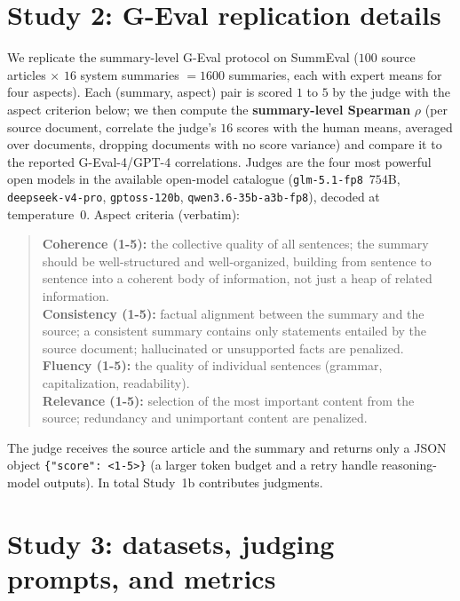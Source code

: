 \section{Study 2: G-Eval replication details}\label{app:s1bdetail}
We replicate the summary-level G-Eval protocol \citep{liu2023geval} on SummEval \citep{fabbri2021summeval}
($100$ source articles $\times$ $16$ system summaries $=1600$ summaries, each with expert means for four aspects).
Each (summary, aspect) pair is scored $1$ to $5$ by the judge with the aspect criterion below; we then compute the
\textbf{summary-level Spearman} $\rho$ (per source document, correlate the judge's $16$ scores with the human means,
averaged over documents, dropping documents with no score variance) and compare it to the reported G-Eval-4/GPT-4
correlations. Judges are the four most powerful open models in the available open-model catalogue
(\texttt{glm-5.1-fp8}~$754$B, \texttt{deepseek-v4-pro}, \texttt{gptoss-120b}, \texttt{qwen3.6-35b-a3b-fp8}), decoded
at temperature~$0$. Aspect criteria (verbatim):
\begin{quote}\small
\textbf{Coherence (1-5):} the collective quality of all sentences; the summary should be well-structured and
well-organized, building from sentence to sentence into a coherent body of information, not just a heap of related
information.\\[2pt]
\textbf{Consistency (1-5):} factual alignment between the summary and the source; a consistent summary contains only
statements entailed by the source document; hallucinated or unsupported facts are penalized.\\[2pt]
\textbf{Fluency (1-5):} the quality of individual sentences (grammar, capitalization, readability).\\[2pt]
\textbf{Relevance (1-5):} selection of the most important content from the source; redundancy and unimportant
content are penalized.
\end{quote}
The judge receives the source article and the summary and returns only a JSON object \verb|{"score": <1-5>}| (a
larger token budget and a retry handle reasoning-model outputs). In total Study~1b contributes \ONEnjudg{} judgments.

\section{Study 3: datasets, judging prompts, and metrics}\label{app:s3detail}
